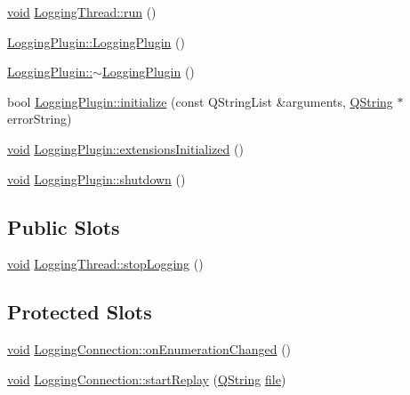 \begin{DoxyCompactItemize}
\hyperlink{group___u_a_v_objects_plugin_ga444cf2ff3f0ecbe028adce838d373f5c}{void} \hyperlink{group___logging_ga1efde5dc8009a1f63a5ab9a52f9c3749}{Logging\-Thread\-::run} ()
\item 
\hyperlink{group___logging_gaddeb416da42e01f34abe18fa2fa39400}{Logging\-Plugin\-::\-Logging\-Plugin} ()
\item 
\hyperlink{group___logging_gaea5e4f27d801294d19b75975ce35a567}{Logging\-Plugin\-::$\sim$\-Logging\-Plugin} ()
\item 
bool \hyperlink{group___logging_ga35b6ec31ee1c4118f1b15d8fb425e013}{Logging\-Plugin\-::initialize} (const Q\-String\-List \&arguments, \hyperlink{group___u_a_v_objects_plugin_gab9d252f49c333c94a72f97ce3105a32d}{Q\-String} $\ast$error\-String)
\item 
\hyperlink{group___u_a_v_objects_plugin_ga444cf2ff3f0ecbe028adce838d373f5c}{void} \hyperlink{group___logging_gafefd3e10b5da148d3f936cc3631e4792}{Logging\-Plugin\-::extensions\-Initialized} ()
\item 
\hyperlink{group___u_a_v_objects_plugin_ga444cf2ff3f0ecbe028adce838d373f5c}{void} \hyperlink{group___logging_ga15f368e20b8953eb38b932e59462c779}{Logging\-Plugin\-::shutdown} ()
\end{DoxyCompactItemize}
\subsection*{Public Slots}
\begin{DoxyCompactItemize}
\item 
\hyperlink{group___u_a_v_objects_plugin_ga444cf2ff3f0ecbe028adce838d373f5c}{void} \hyperlink{group___logging_ga5eba425f2187c79f32c9a7b8187c4de4}{Logging\-Thread\-::stop\-Logging} ()
\end{DoxyCompactItemize}
\subsection*{Protected Slots}
\begin{DoxyCompactItemize}
\item 
\hyperlink{group___u_a_v_objects_plugin_ga444cf2ff3f0ecbe028adce838d373f5c}{void} \hyperlink{group___logging_ga996f0747e733af2177ff669a4311008e}{Logging\-Connection\-::on\-Enumeration\-Changed} ()
\item 
\hyperlink{group___u_a_v_objects_plugin_ga444cf2ff3f0ecbe028adce838d373f5c}{void} \hyperlink{group___logging_ga3b3e0a7dac19231ef21518709df897c3}{Logging\-Connection\-::start\-Replay} (\hyperlink{group___u_a_v_objects_plugin_gab9d252f49c333c94a72f97ce3105a32d}{Q\-String} \hyperlink{uavobjecttemplate_8m_a97c04efa65bcf0928abf9260bc5cbf46}{file})
\end{DoxyCompactItemize}


